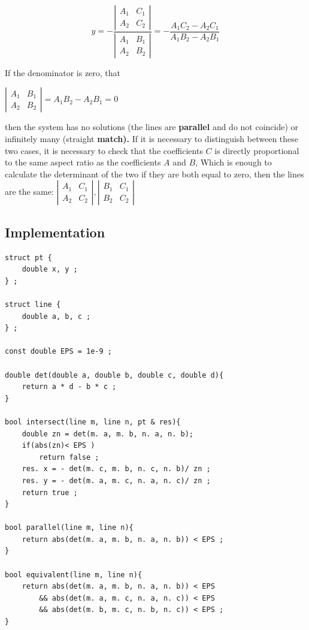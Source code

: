 $$ y=-\frac{\left|\begin{array}{cc}
A_{1} & C_{1}\\
A_{2} & C_{2}
\end{array}\right|}{\left|\begin{array}{cc}
A_{1} & B_{1}\\
A_{2} & B_{2}
\end{array}\right|}=-\frac{A_{1}C_{2}-A_{2}C_{1}}{A_{1}B_{2}-A_{2}B_{1}}$$

If the denominator is zero, that

$ $$\left|\begin{array}{cc}
A_{1} & B_{1}\\
A_{2} & B_{2}
\end{array}\right|=A_{1}B_{2}-A_{2}B_{1}=0$

then the system has no solutions (the lines are \textbf{parallel} and do not coincide) or infinitely many (straight \textbf{match).} If it is necessary to distinguish between these two cases, it is necessary to check that the coefficients $C$ is directly proportional to the same aspect ratio as the coefficients $A$ and $B$, Which is enough to calculate the determinant of the two if they are both equal to zero, then the lines are the same:
$\left|\begin{array}{cc}
A_{1} & C_{1}\\
A_{2} & C_{2}
\end{array}\right|,\left|\begin{array}{cc}
B_{1} & C_{1}\\
B_{2} & C_{2}
\end{array}\right|$

\subsection{ Implementation }

\begin{verbatim}
struct pt {
    double x, y ;
} ;
 
struct line {
    double a, b, c ;
} ;
 
const double EPS = 1e-9 ;
 
double det(double a, double b, double c, double d){
    return a * d - b * c ;
}
 
bool intersect(line m, line n, pt & res){
    double zn = det(m. a, m. b, n. a, n. b);
    if(abs(zn)< EPS )
        return false ;
    res. x = - det(m. c, m. b, n. c, n. b)/ zn ;
    res. y = - det(m. a, m. c, n. a, n. c)/ zn ;
    return true ;
}
 
bool parallel(line m, line n){
    return abs(det(m. a, m. b, n. a, n. b)) < EPS ;
}
 
bool equivalent(line m, line n){
    return abs(det(m. a, m. b, n. a, n. b)) < EPS
        && abs(det(m. a, m. c, n. a, n. c)) < EPS
        && abs(det(m. b, m. c, n. b, n. c)) < EPS ;
} 
\end{verbatim}
